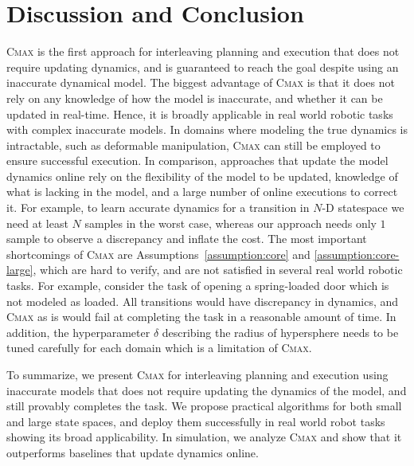 \section{Discussion and Conclusion}
\label{sec:discussion}
\textsc{Cmax} is the first approach for interleaving planning and
execution that does not require updating 
dynamics, and is guaranteed to reach the goal despite
using an inaccurate dynamical model.
The biggest advantage of \textsc{Cmax} is
that it does not rely on any knowledge of how the model is inaccurate, and
whether it can be updated in real-time.
Hence, it
is broadly applicable in real world robotic tasks with complex inaccurate
models.
In domains where modeling the true dynamics is
intractable, such as deformable manipulation, \textsc{Cmax} can still
be employed to ensure successful execution.
In comparison, approaches that update the model dynamics
online rely on the flexibility of the model to be updated, knowledge
of what is lacking in the model, and a large number of online
executions to correct it. For example, to learn accurate dynamics for a transition
in $N$-D statespace we need at least $N$ samples in the worst case,
whereas our approach needs only $1$ sample to observe a discrepancy
and inflate the cost. The most important shortcomings of \textsc{Cmax}
are
Assumptions~\ref{assumption:core} and \ref{assumption:core-large},
which are hard to verify, and are not satisfied in several real world
robotic
tasks. For
example, consider the task of opening a spring-loaded door 
which is not modeled as loaded. All transitions would have discrepancy in
dynamics, and \textsc{Cmax} as is would fail at completing the task
in a reasonable amount of time. In addition, the hyperparameter
$\delta$ describing the radius of hypersphere needs to be
tuned carefully for each domain which is a limitation of \textsc{Cmax}.

To summarize, we present \textsc{Cmax} for interleaving planning
and execution using inaccurate models that does not require updating
the dynamics of the model, and still provably completes the task. We
propose practical algorithms for both small and large state spaces,
and deploy them successfully in real world robot tasks showing its broad
applicability. In simulation, we 
analyze \textsc{Cmax} and show that it outperforms baselines that
update dynamics online.

